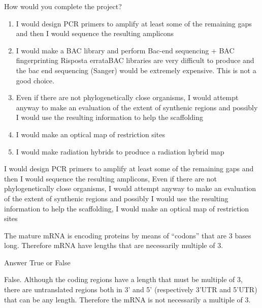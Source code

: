\begin{Exercise} [
  label={ex39},
  origin={G. Valle}
 ]

\Question How would you complete the project?
\begin{enumerate}
\item I would design PCR primers to amplify at least some of the remaining gaps
and then I would sequence the resulting amplicons
\item I would make a BAC library and perform Bac-end sequencing + BAC
fingerprinting Risposta errataBAC libraries are very difficult to produce and
the bac end sequencing (Sanger) would be extremely expensive. This is not a
good choice.
\item Even if there are not phylogenetically close organisms, I would attempt
anyway to make an evaluation of the extent of synthenic regions and possibly I
would use the resulting information to help the scaffolding
\item I would make an optical map of restriction sites
\item I would make radiation hybrids to produce a radiation hybrid map
\end{enumerate}

\end{Exercise}

\begin{Answer} [
  ref={ex39},
  number={1}
 ]

\Question  I would design PCR primers to amplify at least some of the remaining
gaps and then I would sequence the resulting amplicons, Even if there are not
phylogenetically close organisms, I would attempt anyway to make an evaluation
of the extent of synthenic regions and possibly I would use the resulting
information to help the scaffolding, I would make an optical map of restriction
sites

\end{Answer}

\begin{Exercise} [
  label={ex40},
  origin={G. Valle}
 ]

\Question The mature mRNA is encoding proteins by means of “codons” that are 3
bases long. Therefore mRNA have lengths that are necessarily multiple of 3.

Answer True or False

\end{Exercise}

\begin{Answer} [
  ref={ex40},
  number={1}
 ]

\Question False. Although the coding regions have a length that must be
multiple of 3, there are untranslated regions both in 3' and 5' (respectively
3'UTR and 5'UTR) that can be any length. Therefore the mRNA is not necessarily
a multiple of 3.

\end{Answer}

